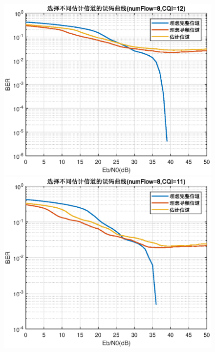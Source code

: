 \documentclass{article}
\begin{document}
\begin{figure}[htbp]
	\centering
	\begin{minipage}[t]{0.48\textwidth}
	\centering
	\includegraphics[width=\textwidth]{plot/plot_CQI12.eps}
	\end{minipage}
	\begin{minipage}[t]{0.48\textwidth}
	\centering
	\includegraphics[width=\textwidth]{plot/plot_CQI11.eps}
	\end{minipage}
\end{figure}
\end{document}
